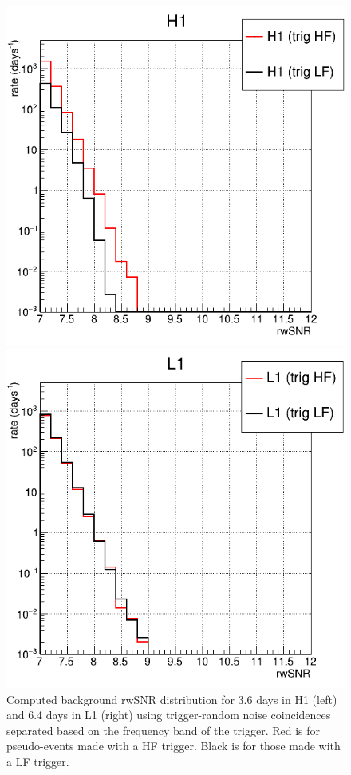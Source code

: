 \begin{figure}
  \centering
  \begin{minipage}{0.45\linewidth}
    \includegraphics[width=\linewidth]{sectionFAR/O4/cRwSplitTrigH1_380000.png}
  \end{minipage}
  \begin{minipage}{0.45\linewidth}
    \includegraphics[width=\linewidth]{sectionFAR/O4/cRwSplitTrigL1_730000.png}
  \end{minipage}
  \caption{Computed background rwSNR distribution for 3.6 days in H1 (left) and 6.4 days in L1 (right) using trigger-random noise coincidences separated based on the frequency band of the trigger.
  Red is for pseudo-events made with a HF trigger. Black is for those made with a LF trigger.}
  \label{fig:computed_splitBand}
\end{figure}


